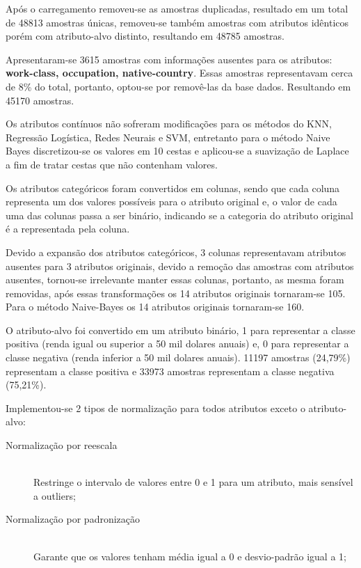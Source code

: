 Após o carregamento removeu-se as amostras duplicadas, resultado em um total de 48813 amostras únicas, removeu-se também amostras com atributos idênticos porém com atributo-alvo distinto, resultando em 48785 amostras.

Apresentaram-se 3615 amostras com informações ausentes para os atributos: \textbf{ work-class, occupation, native-country}. Essas amostras representavam cerca de 8\% do total, portanto, optou-se por removê-las da base dados. Resultando em 45170 amostras.

Os atributos contínuos não sofreram modificações para os métodos do KNN, Regressão Logística, Redes Neurais e SVM, entretanto para o método Naive Bayes discretizou-se os valores em 10 cestas e aplicou-se a suavização de Laplace a fim de tratar cestas que não contenham valores.

Os atributos categóricos foram convertidos em colunas, sendo que cada coluna representa um dos valores possíveis para o atributo original e, o valor de cada uma das colunas passa a ser binário, indicando se a categoria do atributo original é a representada pela coluna. 

Devido a expansão dos atributos categóricos, 3 colunas representavam atributos ausentes para 3 atributos originais, devido a remoção das amostras com atributos ausentes, tornou-se irrelevante manter essas colunas, portanto, as mesma foram removidas, após essas transformações os 14 atributos originais tornaram-se 105.
Para o método Naive-Bayes os 14 atributos originais tornaram-se 160. 

O atributo-alvo foi convertido em um atributo binário, 1 para representar a classe positiva (renda igual ou superior a 50 mil dolares anuais) e, 0 para representar a classe negativa (renda inferior a 50 mil dolares anuais). 11197 amostras (24,79\%) representam a classe positiva e 33973 amostras representam a classe negativa (75,21\%).

Implementou-se 2 tipos de normalização para todos atributos exceto o atributo-alvo:

\begin{description}
\item[Normalização por reescala] \hfill \\ Restringe o intervalo de valores entre 0 e 1 para um atributo, mais sensível a outliers;
\item[Normalização por padronização] \hfill \\ Garante que os valores tenham média igual a 0 e desvio-padrão igual a 1;
\end{description}




